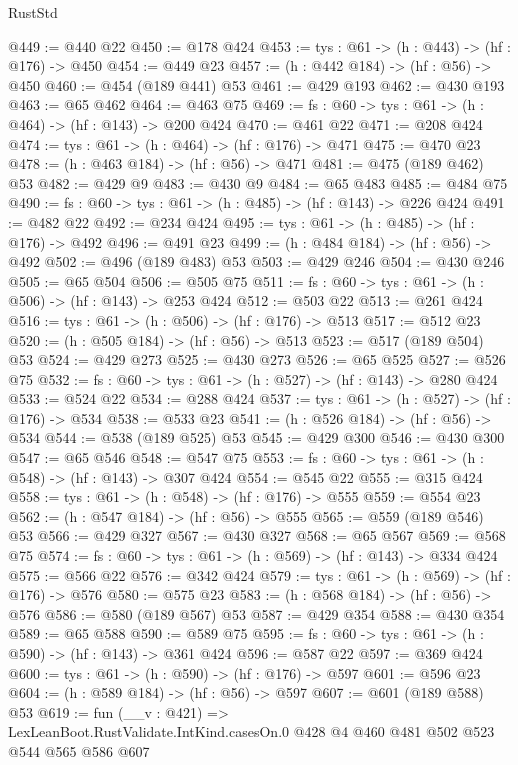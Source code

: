 \begin{lexlean}{RustStd}
\begin{coremodule}
{\begin{coremodule}
{{{{{{{{{{{{{{{{{{{{{{{{{{@449 := @440 @22
@450 := @178 @424
@453 := {tys : @61} -> (h : @443) -> (hf : @176) -> @450
@454 := @449 @23
@457 := (h : @442 @184) -> (hf : @56) -> @450
@460 := @454 (@189 @441) @53
@461 := @429 @193
@462 := @430 @193
@463 := @65 @462
@464 := @463 @75
@469 := {fs : @60} -> {tys : @61} -> (h : @464) -> (hf : @143) -> @200 @424
@470 := @461 @22
@471 := @208 @424
@474 := {tys : @61} -> (h : @464) -> (hf : @176) -> @471
@475 := @470 @23
@478 := (h : @463 @184) -> (hf : @56) -> @471
@481 := @475 (@189 @462) @53
@482 := @429 @9
@483 := @430 @9
@484 := @65 @483
@485 := @484 @75
@490 := {fs : @60} -> {tys : @61} -> (h : @485) -> (hf : @143) -> @226 @424
@491 := @482 @22
@492 := @234 @424
@495 := {tys : @61} -> (h : @485) -> (hf : @176) -> @492
@496 := @491 @23
@499 := (h : @484 @184) -> (hf : @56) -> @492
@502 := @496 (@189 @483) @53
@503 := @429 @246
@504 := @430 @246
@505 := @65 @504
@506 := @505 @75
@511 := {fs : @60} -> {tys : @61} -> (h : @506) -> (hf : @143) -> @253 @424
@512 := @503 @22
@513 := @261 @424
@516 := {tys : @61} -> (h : @506) -> (hf : @176) -> @513
@517 := @512 @23
@520 := (h : @505 @184) -> (hf : @56) -> @513
@523 := @517 (@189 @504) @53
@524 := @429 @273
@525 := @430 @273
@526 := @65 @525
@527 := @526 @75
@532 := {fs : @60} -> {tys : @61} -> (h : @527) -> (hf : @143) -> @280 @424
@533 := @524 @22
@534 := @288 @424
@537 := {tys : @61} -> (h : @527) -> (hf : @176) -> @534
@538 := @533 @23
@541 := (h : @526 @184) -> (hf : @56) -> @534
@544 := @538 (@189 @525) @53
@545 := @429 @300
@546 := @430 @300
@547 := @65 @546
@548 := @547 @75
@553 := {fs : @60} -> {tys : @61} -> (h : @548) -> (hf : @143) -> @307 @424
@554 := @545 @22
@555 := @315 @424
@558 := {tys : @61} -> (h : @548) -> (hf : @176) -> @555
@559 := @554 @23
@562 := (h : @547 @184) -> (hf : @56) -> @555
@565 := @559 (@189 @546) @53
@566 := @429 @327
@567 := @430 @327
@568 := @65 @567
@569 := @568 @75
@574 := {fs : @60} -> {tys : @61} -> (h : @569) -> (hf : @143) -> @334 @424
@575 := @566 @22
@576 := @342 @424
@579 := {tys : @61} -> (h : @569) -> (hf : @176) -> @576
@580 := @575 @23
@583 := (h : @568 @184) -> (hf : @56) -> @576
@586 := @580 (@189 @567) @53
@587 := @429 @354
@588 := @430 @354
@589 := @65 @588
@590 := @589 @75
@595 := {fs : @60} -> {tys : @61} -> (h : @590) -> (hf : @143) -> @361 @424
@596 := @587 @22
@597 := @369 @424
@600 := {tys : @61} -> (h : @590) -> (hf : @176) -> @597
@601 := @596 @23
@604 := (h : @589 @184) -> (hf : @56) -> @597
@607 := @601 (@189 @588) @53
@619 := fun (__v : @421) =>
  LexLeanBoot.RustValidate.IntKind.casesOn.{0} @428 @4 @460 @481 @502 @523 @544 @565 @586 @607
}}}}}}}}}}}}}}}}}}}}}}}}}}
\end{coremodule}}
\end{coremodule}
\end{lexlean}
